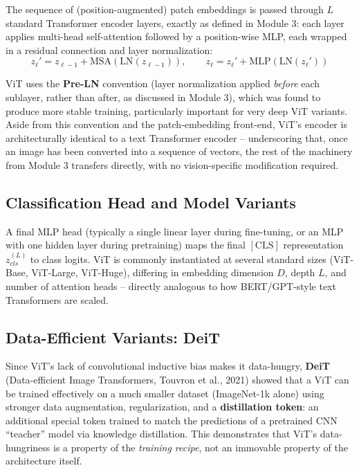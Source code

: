 \documentclass[12pt,a4paper]{article}
\begin{document}
\begin{defbox}
The sequence of (position-augmented) patch embeddings is passed through $L$ standard Transformer encoder layers, exactly as defined in Module 3: each layer applies multi-head self-attention followed by a position-wise MLP, each wrapped in a residual connection and layer normalization:
\[
z_\ell' = z_{\ell-1} + \text{MSA}(\text{LN}(z_{\ell-1})), \qquad z_\ell = z_\ell' + \text{MLP}(\text{LN}(z_\ell'))
\]
\end{defbox}

\begin{keyidea}
ViT uses the \textbf{Pre-LN} convention (layer normalization applied \emph{before} each sublayer, rather than after, as discussed in Module 3), which was found to produce more stable training, particularly important for very deep ViT variants. Aside from this convention and the patch-embedding front-end, ViT's encoder is architecturally identical to a text Transformer encoder -- underscoring that, once an image has been converted into a sequence of vectors, the rest of the machinery from Module 3 transfers directly, with no vision-specific modification required.
\end{keyidea}

\subsection{Classification Head and Model Variants}

A final MLP head (typically a single linear layer during fine-tuning, or an MLP with one hidden layer during pretraining) maps the final $[\text{CLS}]$ representation $z_{cls}^{(L)}$ to class logits. ViT is commonly instantiated at several standard sizes (ViT-Base, ViT-Large, ViT-Huge), differing in embedding dimension $D$, depth $L$, and number of attention heads -- directly analogous to how BERT/GPT-style text Transformers are scaled.

\subsection{Data-Efficient Variants: DeiT}

\begin{keyidea}
Since ViT's lack of convolutional inductive bias makes it data-hungry, \textbf{DeiT} (Data-efficient Image Transformers, Touvron et al., 2021) showed that a ViT can be trained effectively on a much smaller dataset (ImageNet-1k alone) using stronger data augmentation, regularization, and a \textbf{distillation token}: an additional special token trained to match the predictions of a pretrained CNN ``teacher'' model via knowledge distillation. This demonstrates that ViT's data-hungriness is a property of the \emph{training recipe}, not an immovable property of the architecture itself.
\end{keyidea}
\end{document}
